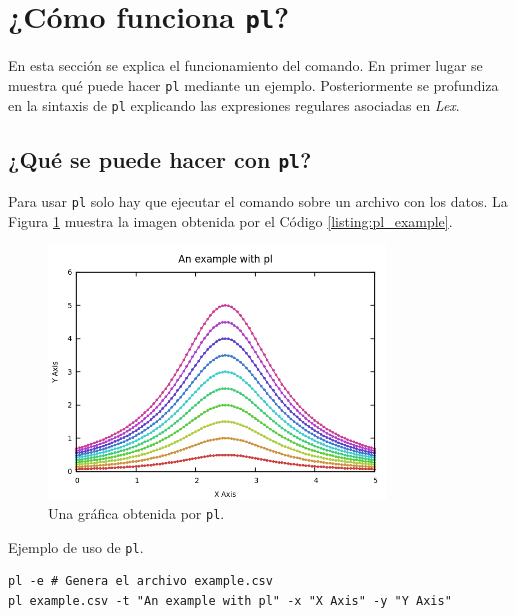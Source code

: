 \documentclass{article}
\begin{document}

\section{¿Cómo funciona \texttt{pl}?}

	En esta sección se explica el funcionamiento del comando. En primer lugar se muestra qué puede hacer \texttt{pl} mediante un ejemplo. Posteriormente se profundiza en la sintaxis de \texttt{pl} explicando las expresiones regulares asociadas en \textit{Lex}.

	\subsection{¿Qué se puede hacer con \texttt{pl}?}

		Para usar \texttt{pl} solo hay que ejecutar el comando sobre un archivo con los datos. La Figura \ref{fig:example1} muestra la imagen obtenida por el Código \ref{listing:pl_example}.

        \begin{figure}[H]
        	\centering
			\includegraphics[width=0.8\textwidth]{../../images/example.png}
        	\caption{Una gráfica obtenida por \texttt{pl}.}
        	\label{fig:example1}
        \end{figure}

		\begin{listing}
			\caption{Ejemplo de uso de \texttt{pl}.}
			\begin{verbatim}
pl -e # Genera el archivo example.csv
pl example.csv -t "An example with pl" -x "X Axis" -y "Y Axis"
			\end{verbatim}
			\label{listing:pl_example}
		\end{listing}
\end{document}
